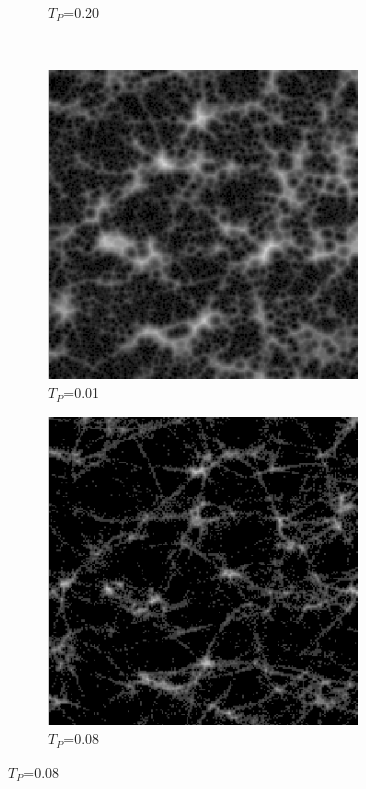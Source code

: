 \begin{figure}[H]
\begin{minipage}{0.5\textwidth}
\begin{subfigure}{0.5\textwidth}
    \caption{$T_P$=0.20}
  \end{subfigure}%
\end{minipage}
\begin{minipage}{0.5\textwidth}
  \centering
  \\
  \begin{subfigure}{0.5\textwidth}
    \centering
    \includegraphics[width=0.9\textwidth]{Figures/chapter-image/distance/fig_dist_01.png}
    \caption{$T_P$=0.01}
  \end{subfigure}%
  \begin{subfigure}{0.5\textwidth}
    \centering
    \includegraphics[width=0.9\textwidth]{Figures/chapter-image/distance/fig_dist_08.png}
    \caption{$T_P$=0.08}
  \end{subfigure}


\end{minipage}
\end{figure}
